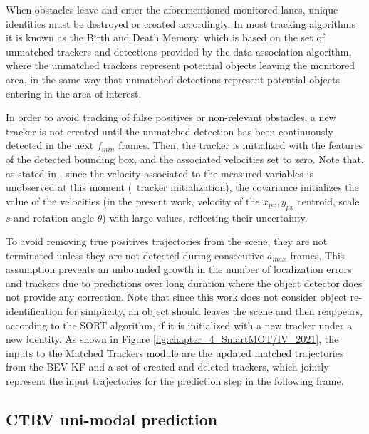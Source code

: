 When obstacles leave and enter the aforementioned monitored lanes, unique identities must be destroyed or created accordingly. In most tracking algorithms it is known as the Birth and Death Memory, which is based on the set of unmatched trackers and detections provided by the data association algorithm, where the unmatched trackers represent potential objects leaving the monitored area, in the same way that unmatched detections represent potential objects entering in the area of interest. 

In order to avoid tracking of false positives or non-relevant obstacles, a new tracker is not created until the unmatched detection has been continuously detected in the next $f_{min}$ frames. Then, the tracker is initialized with the features of the detected bounding box, and the associated velocities set to zero. Note that, as stated in \cite{bewley2016simple}, since the velocity associated to the measured variables is unobserved at this moment (\ie \, tracker initialization), the covariance initializes the value of the velocities (in the present work, velocity of the $x_{px},y_{px}$ centroid, scale $s$ and rotation angle $\theta$) with large values, reflecting their uncertainty. 

To avoid removing true positives trajectories from the scene, they are not terminated unless they are not detected during consecutive $a_{max}$ frames. This assumption prevents an unbounded growth in the number of localization errors and trackers due to predictions over long duration where the object detector does not provide any correction. Note that since this work does not consider object re-identification for simplicity, an object should leaves the scene and then reappears, according to the \ac{SORT} algorithm, if it is initialized with a new tracker under a new identity. As shown in Figure \ref{fig:chapter_4_SmartMOT/IV_2021}, the inputs to the Matched Trackers module are the updated matched trajectories from the \ac{BEV} \ac{KF} and a set of created and deleted trackers, which jointly represent the input trajectories for the prediction step in the following frame.

\subsection{\ac{CTRV} uni-modal prediction}
\label{subsec:4_smartmot_ctrv_prediction}

